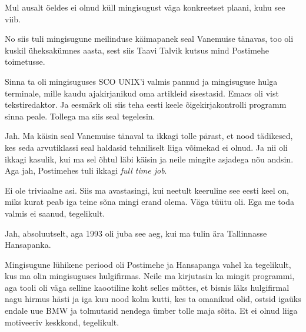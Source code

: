 Mul ausalt öeldes ei olnud küll mingisugust väga konkreetset plaani, kuhu see viib.

No siis tuli mingisugune meilinduse käimapanek seal Vanemuise tänavas, too  oli kuskil üheksakümnes aasta, sest siis Taavi Talvik kutsus mind Postimehe toimetusse.

Sinna ta oli mingisuguses SCO UNIX'i valmis pannud ja mingisuguse hulga terminale, mille kaudu ajakirjanikud oma artikleid sisestasid. Emacs oli vist tekstiredaktor. Ja eesmärk oli siis teha eesti keele õigekirjakontrolli programm sinna peale. Tollega ma siis seal tegelesin. 


Jah. Ma käisin seal Vanemuise tänaval ta ikkagi tolle pärast, et nood tädikesed, kes seda arvutiklassi seal haldasid tehniliselt liiga võimekad ei olnud. Ja nii oli ikkagi kasulik, kui ma sel õhtul läbi käisin ja neile mingite asjadega nõu andsin. Aga jah, Postimehes tuli ikkagi \emph{full time job}.


Ei ole triviaalne asi. Siis ma avastasingi, kui neetult keeruline see eesti keel on, miks kurat peab iga teine sõna mingi erand olema. Väga tüütu oli. Ega me toda valmis ei saanud, tegelikult.


Jah, absoluutselt, aga  1993 oli juba see aeg, kui ma tulin ära Tallinnasse Hansapanka.


Mingisugune lühikene periood oli Postimehe ja Hansapanga vahel ka tegelikult, kus ma olin mingisuguses hulgifirmas. Neile ma  kirjutasin ka mingit programmi, aga tooli oli väga selline kaootiline koht selles mõttes, et  bisnis läks hulgifirmal nagu hirmus hästi ja iga kuu nood kolm kutti, kes ta omanikud olid, ostsid igaüks endale uue BMW ja tolmutasid nendega ümber tolle maja sõita. Et ei olnud liiga motiveeriv keskkond, tegelikult.

